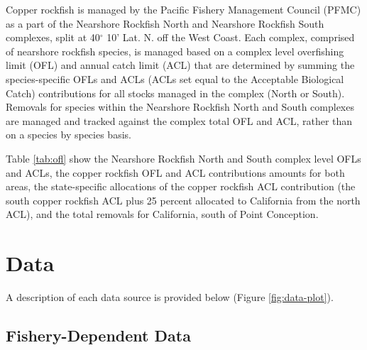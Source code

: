 \documentclass[11pt,
  english,
  a4paper,
]{article}
\begin{document}
Copper rockfish is managed by the Pacific Fishery Management Council (PFMC) as a part of the Nearshore Rockfish North and Nearshore Rockfish South complexes, split at 40{\(^\circ\)\leavevmode\tagmcend\tagstructend} 10' Lat. N. off the West Coast. Each complex, comprised of nearshore rockfish species, is managed based on a complex level overfishing limit (OFL) and annual catch limit (ACL) that are determined by summing the species-specific OFLs and ACLs (ACLs set equal to the Acceptable Biological Catch) contributions for all stocks managed in the complex (North or South). Removals for species within the Nearshore Rockfish North and South complexes are managed and tracked against the complex total OFL and ACL, rather than on a species by species basis.

\leavevmode\tagmcend\tagstructend\par


Table \ref{tab:ofl} show the Nearshore Rockfish North and South complex level OFLs and ACLs, the copper rockfish OFL and ACL contributions amounts for both areas, the state-specific allocations of the copper rockfish ACL contribution (the south copper rockfish ACL plus 25 percent allocated to California from the north ACL), and the total removals for California, south of Point Conception.

\leavevmode\tagmcend\tagstructend\par


\hypertarget{data}{%
\section{Data}\label{data}}

\leavevmode\tagmcend\tagstructend


A description of each data source is provided below (Figure \ref{fig:data-plot}).

\leavevmode\tagmcend\tagstructend\par


\hypertarget{fishery-dependent-data}{%
\subsection{Fishery-Dependent Data}\label{fishery-dependent-data}}
\end{document}
